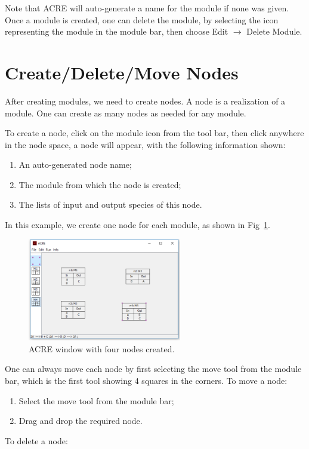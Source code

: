 \documentclass{report}
\begin{document}
Note that ACRE will auto-generate a name for the module if none was given. Once a module is
created, one can delete the module, by selecting the icon representing the module in the
module bar, then choose Edit $\rightarrow$ Delete Module.

\section{Create/Delete/Move Nodes}

After creating modules, we need to create nodes. A node is a realization of a module. One can
create as many nodes as needed for any module.

To create a node, click on the module icon from the tool bar, then click anywhere in the node
space, a node will appear, with the following information shown:
\begin{enumerate}
	\item An auto-generated node name;
	\item The module from which the node is created;
	\item The lists of input and output species of this node.
\end{enumerate}

In this example, we create one node for each module, as shown in Fig~\ref{fig:6}.

\begin{figure}
	\centering
		\includegraphics[width=0.6\textwidth]{6}
	\caption{ACRE window with four nodes created.}
	\label{fig:6}
\end{figure}

One can always move each node by first selecting the move tool from the module bar, which is
the first tool showing 4 squares in the corners. To move a node:
\begin{enumerate}
	\item Select the move tool from the module bar;
	\item Drag and drop the required node.
\end{enumerate}
To delete a node:
\end{document}
